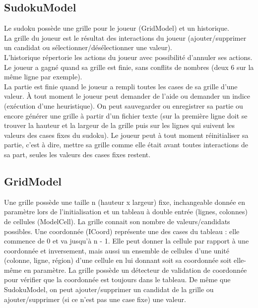 \subsection{SudokuModel}
Le sudoku possède une grille pour le joueur (GridModel) et un historique.\\ 
La grille du joueur est le résultat des interactions du joueur (ajouter/supprimer 
un candidat ou sélectionner/désélectionner une valeur). \\
L’historique répertorie les actions du joueur avec possibilité d’annuler ses actions.\\ 
Le joueur a gagné quand sa grille est finie, sans conflits de nombres 
(deux 6 sur la même ligne par exemple).\\
La partie est finie quand le joueur a rempli toutes les cases de sa grille d’une valeur. 
À tout moment le joueur peut demander de l’aide ou demander un indice (exécution d’une
heuristique). On peut sauvegarder ou enregistrer sa partie ou encore générer une grille
à partir d’un fichier texte (sur la première ligne doit se trouver la hauteur
et la largeur de la grille puis sur les lignes qui suivent les valeurs des cases
fixes du sudoku). Le joueur peut à tout moment réinitialiser sa partie, c’est
à dire, mettre sa grille comme elle était avant toutes interactions de sa part,
seules les valeurs des cases fixes restent.

\subsection{GridModel}
Une grille possède une taille n (hauteur x largeur) fixe, inchangeable donnée en paramètre lors de l'initialisation et
un tableau à double entrée (lignes, colonnes) de cellules (ModelCell).
La grille connait son nombre de valeurs/candidats possibles.
Une coordonnée (ICoord) représente une des cases du tableau : elle commence de 0 et va jusqu'à n - 1.
Elle peut donner la cellule par rapport à une coordonnée et inversement, mais aussi un ensemble de cellules d'une
unité (colonne, ligne, région) d'une cellule en lui donnant soit sa coordonnée soit elle-même en paramètre.
La grille possède un détecteur de validation de coordonnée pour vérifier que la coordonnée est toujours dans le tableau. 
De même que SudokuModel, on peut ajouter/supprimer un candidat de la grille ou ajouter/supprimer (si ce n'est pas une 
case fixe) une valeur.

